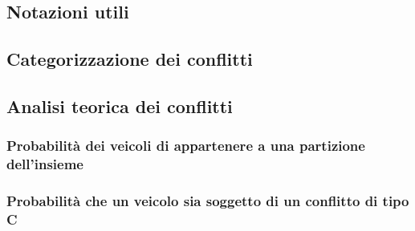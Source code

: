 \documentclass[../main.tex]{subfiles}
\begin{document}
\subsection{Notazioni utili}


\subsection{Categorizzazione dei conflitti}


\subsection{Analisi teorica dei conflitti}
\subsubsection{Probabilità dei veicoli di appartenere a una partizione dell'insieme}

\subsubsection{Probabilità che un veicolo sia soggetto di un conflitto di tipo C}

\end{document}
